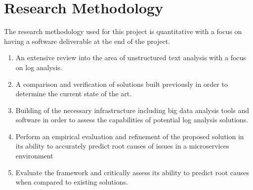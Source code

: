 \chapter{Research Methodology}
The research methodology used for this project is quantitative with a focus on having a software deliverable at the end of the project.

\begin{enumerate}
    \item An extensive review into the area of unstructured text analysis with a focus on log analysis.
    \item A comparison and verification of solutions built previously in order to determine the current state of the art.
    \item Building of the necessary infrastructure including big data analysis tools and software in order to assess the capabilities of potential log analysis solutions.
    \item Perform an empirical evaluation and refinement of the proposed solution in its ability to accurately predict root causes of issues in a microservices environment
    \item Evaluate the framework and critically assess its ability to predict root causes when compared to existing solutions.
\end{enumerate}